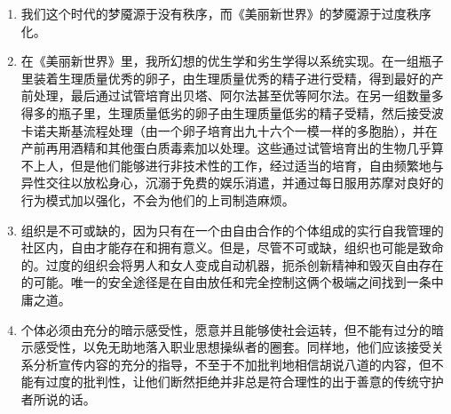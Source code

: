 \documentclass[UTF8]{ctexart}
\begin{document}
\begin{enumerate}
				\item 我们这个时代的梦魇源于没有秩序，而《美丽新世界》的梦魇源于过度秩序化。  
				
				\item 在《美丽新世界》里，我所幻想的优生学和劣生学得以系统实现。在一组瓶子里装着生理质量优秀的卵子，由生理质量优秀的精子进行受精，得到最好的产前处理，最后通过试管培育出贝塔、阿尔法甚至优等阿尔法。在另一组数量多得多的瓶子里，生理质量低劣的卵子由生理质量低劣的精子受精，然后接受波卡诺夫斯基流程处理（由一个卵子培育出九十六个一模一样的多胞胎），并在产前再用酒精和其他蛋白质毒素加以处理。这些通过试管培育出的生物几乎算不上人，但是他们能够进行非技术性的工作，经过适当的培育，自由频繁地与异性交往以放松身心，沉溺于免费的娱乐消遣，并通过每日服用苏摩对良好的行为模式加以强化，不会为他们的上司制造麻烦。
				
				\item 组织是不可或缺的，因为只有在一个由自由合作的个体组成的实行自我管理的社区内，自由才能存在和拥有意义。但是，尽管不可或缺，组织也可能是致命的。过度的组织会将男人和女人变成自动机器，扼杀创新精神和毁灭自由存在的可能。唯一的安全途径是在自由放任和完全控制这俩个极端之间找到一条中庸之道。
				
				\item 个体必须由充分的暗示感受性，愿意并且能够使社会运转，但不能有过分的暗示感受性，以免无助地落入职业思想操纵者的圈套。同样地，他们应该接受关系分析宣传内容的充分的指导，不至于不加批判地相信胡说八道的内容，但不能有过度的批判性，让他们断然拒绝并非总是符合理性的出于善意的传统守护者所说的话。
			
			\end{enumerate}
	\newpage
	
\end{document}
